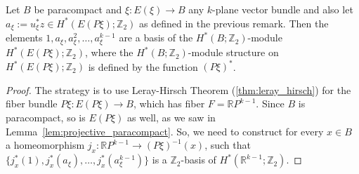 \begin{proposition}\label{prop:basis_of_EP} Let $B$ be paracompact and $\xi:E(\xi)\to B$ any $k$-plane vector bundle and also let $a_{\xi}:=u_{\xi}^*z\in H^*(E(P\xi);\mathbb{Z}_2)$ as defined in the previous remark. Then the elements $1,a_{\xi},a_{\xi}^2,\ldots,a_{\xi}^{k-1}$ are a basis of the $H^*(B;\mathbb{Z}_2)$-module $H^*(E(P\xi);\mathbb{Z}_2)$, where the $H^*(B;\mathbb{Z}_2)$-module structure on $H^*(E(P\xi);\mathbb{Z}_2)$ is defined by the function $(P\xi)^*$.
\end{proposition}
\begin{proof} The strategy is to use Leray-Hirsch Theorem (\ref{thm:leray_hirsch}) for the fiber bundle $P\xi:E(P\xi)\to B$, which has fiber $F=\mathbb{R}P^{k-1}$. Since $B$ is paracompact, so is $E(P\xi)$ as well, as we saw in Lemma~\ref{lem:projective_paracompact}. So, we need to construct for every $x\in B$ a homeomorphism $j_x:\mathbb{R}P^{k-1}\to(P\xi)^{-1}(x)$, such that $\{j_x^*(1),j_x^*(a_{\xi}),\ldots,j_x^*(a_{\xi}^{k-1})\}$ is a $\mathbb{Z}_2$-basis of $H^*(\mathbb{R}^{k-1};\mathbb{Z}_2)$.


\end{proof}
